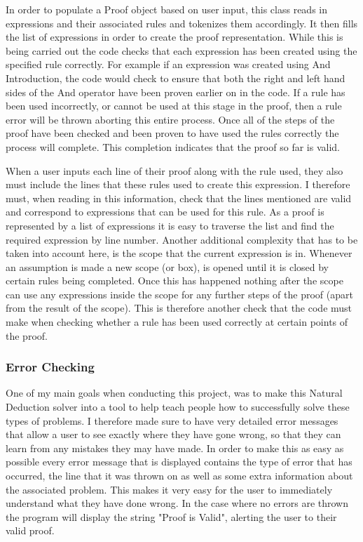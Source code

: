 In order to populate a Proof object based on user input, this class reads in expressions and their associated rules and tokenizes them accordingly. It then fills the list of expressions in order to create the proof representation. While this is being carried out the code checks that each expression has been created using the specified rule correctly. For example if an expression was created using And Introduction, the code would check to ensure that both the right and left hand sides of the And operator have been proven earlier on in the code. If a rule has been used incorrectly, or cannot be used at this stage in the proof, then a rule error will be thrown aborting this entire process. Once all of the steps of the proof have been checked and been proven to have used the rules correctly the process will complete. This completion indicates that the proof so far is valid. 

When a user inputs each line of their proof along with the rule used, they also must include the lines that these rules used to create this expression. I therefore must, when reading in this information, check that the lines mentioned are valid and correspond to expressions that can be used for this rule. As a proof is represented by a list of expressions it is easy to traverse the list and find the required expression by line number. Another additional complexity that has to be taken into account here, is the scope that the current expression is in. Whenever an assumption is made a new scope (or box), is opened until it is closed by certain rules being completed. Once this has happened nothing after the scope can use any expressions inside the scope for any further steps of the proof (apart from the result of the scope). This is therefore another check that the code must make when checking whether a rule has been used correctly at certain points of the proof.

\subsubsection{Error Checking}
One of my main goals when conducting this project, was to make this Natural Deduction solver into a tool to help teach people how to successfully solve these types of problems. I therefore made sure to have very detailed error messages that allow a user to see exactly where they have gone wrong, so that they can learn from any mistakes they may have made. In order to make this as easy as possible every error message that is displayed contains the type of error that has occurred, the line that it was thrown on as well as some extra information about the associated problem. This makes it very easy for the user to immediately understand what they have done wrong. In the case where no errors are thrown the program will display the string "Proof is Valid", alerting the user to their valid proof. 

